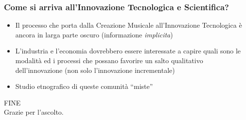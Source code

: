 \documentclass[compress]{beamer}
\begin{document}
\begin{frame}
    \frametitle<+- | alert@+->{Come si arriva all'Innovazione Tecnologica e Scientifica?}

    \begin{itemize}[<+- | alert@+->]
        \item Il processo che porta dalla Creazione Musicale all'Innovazione
            Tecnologica \`e ancora in larga parte oscuro (informazione
            \emph{implicita})
        \item L'industria e l'economia dovrebbero essere interessate a capire quali
            sono le modalit\`a ed i processi che possano favorire un salto
            qualitativo dell'innovazione (non solo l'innovazione incrementale)
        \item Studio etnografico di queste comunit\`a ``miste''
    \end{itemize}
    
\end{frame}

\begin{frame}
    \begin{center}
        {\Huge FINE}\\[2\baselineskip]
        Grazie per l'ascolto.
    \end{center}
\end{frame}
\end{document}
